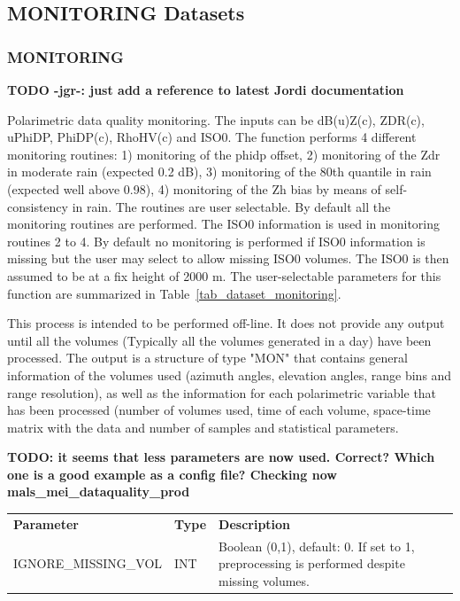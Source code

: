 \documentclass[a4paper,11pt,pdftex,twoside]{scrartcl}
\renewcommand{\bf}{\normalfont \bfseries}
\begin{document}
{{{\subsection{MONITORING Datasets}

\subsubsection{MONITORING}
\label{subsec_monitoring}

{\bf TODO -jgr-: just add a reference to latest Jordi documentation}

Polarimetric data quality monitoring. The inputs can be dB(u)Z(c), ZDR(c), uPhiDP, PhiDP(c), RhoHV(c) and ISO0. The function performs 4 different monitoring routines: 1) monitoring of the phidp offset, 2) monitoring of the Zdr in moderate rain (expected 0.2 dB), 3) monitoring of the 80th quantile in rain (expected well above 0.98), 4) monitoring of the Zh bias by means of self-consistency in rain. The routines are user selectable. By default all the monitoring routines are performed. The ISO0 information is used in monitoring routines 2 to 4. By default no monitoring is performed if ISO0 information is missing but the user may select to allow missing ISO0 volumes. The ISO0 is then assumed to be at a fix height of 2000 m. The user-selectable parameters for this function are summarized in Table~\ref{tab_dataset_monitoring}.

This process is intended to be performed off-line. It does not provide any output until all the volumes (Typically all the volumes generated in a day) have been processed. The output is a structure of type "MON" that contains general information of the volumes used (azimuth angles, elevation angles, range bins and range resolution), as well as the information for each polarimetric variable that has been processed (number of volumes used, time of each volume, space-time matrix with the data and number of samples and statistical parameters.

{\bf TODO: it seems that less parameters are now used. Correct? Which one is a good example as a config file? Checking now mals\_mei\_dataquality\_prod}

\begin{table}[H]
\begin{tabularx}{\textwidth}{llX}
\bf{Parameter}  & \bf{Type}  & \bf{Description}\\
IGNORE\_MISSING\_VOL         & INT     & Boolean (0,1), default: 0. If set to 1, preprocessing is performed despite missing volumes.\\


\end{tabularx}
\end{table}}}}
\end{document}
